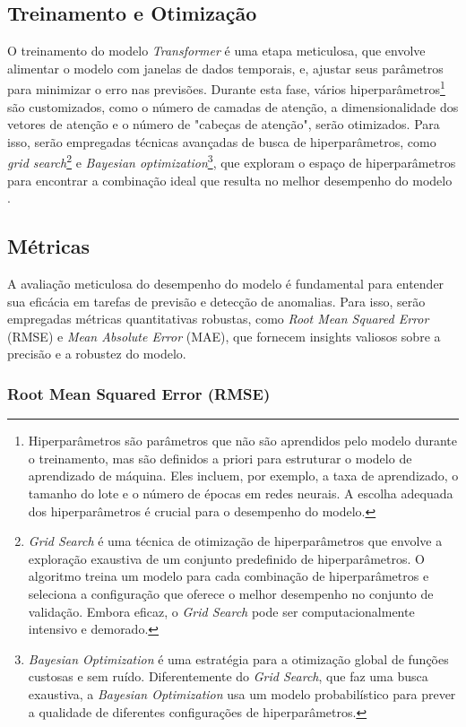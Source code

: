 \subsection{Treinamento e Otimização}
O treinamento do modelo \textit{Transformer} é uma etapa meticulosa, que envolve alimentar o modelo com janelas de dados temporais, e, ajustar seus parâmetros para minimizar o erro nas previsões. Durante esta fase, vários hiperparâmetros\footnote{Hiperparâmetros são parâmetros que não são aprendidos pelo modelo durante o treinamento, mas são definidos a priori para estruturar o modelo de aprendizado de máquina. Eles incluem, por exemplo, a taxa de aprendizado, o tamanho do lote e o número de épocas em redes neurais. A escolha adequada dos hiperparâmetros é crucial para o desempenho do modelo.} são customizados, como o número de camadas de atenção, a dimensionalidade dos vetores de atenção e o número de "cabeças de atenção", serão otimizados. Para isso, serão empregadas técnicas avançadas de busca de hiperparâmetros, como \textit{grid search}\footnote{\textit{Grid Search} é uma técnica de otimização de hiperparâmetros que envolve a exploração exaustiva de um conjunto predefinido de hiperparâmetros. O algoritmo treina um modelo para cada combinação de hiperparâmetros e seleciona a configuração que oferece o melhor desempenho no conjunto de validação. Embora eficaz, o \textit{Grid Search} pode ser computacionalmente intensivo e demorado.} e \textit{Bayesian optimization}\footnote{\textit{Bayesian Optimization} é uma estratégia para a otimização global de funções custosas e sem ruído. Diferentemente do \textit{Grid Search}, que faz uma busca exaustiva, a \textit{Bayesian Optimization} usa um modelo probabilístico para prever a qualidade de diferentes configurações de hiperparâmetros.}, que exploram o espaço de hiperparâmetros para encontrar a combinação ideal que resulta no melhor desempenho do modelo \cite{bergstra2012random}.

\subsection{Métricas}
A avaliação meticulosa do desempenho do modelo é fundamental para entender sua eficácia em tarefas de previsão e detecção de anomalias. Para isso, serão empregadas métricas quantitativas robustas, como \textit{Root Mean Squared Error} (RMSE) e \textit{Mean Absolute Error} (MAE), que fornecem insights valiosos sobre a precisão e a robustez do modelo.

\subsubsection{Root Mean Squared Error (RMSE)}

